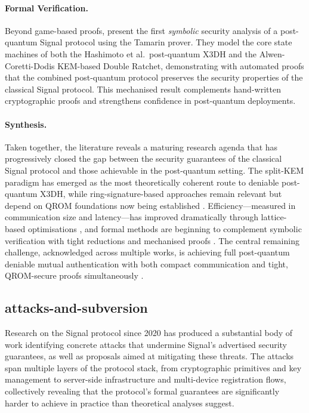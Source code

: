 \paragraph{Formal Verification.}
Beyond game-based proofs, \textcite{beguinet2024} present the first \emph{symbolic} security analysis of a post-quantum Signal protocol using the Tamarin prover. They model the core state machines of both the Hashimoto et al.\ post-quantum X3DH \parencite{hashimoto2021} and the Alwen-Coretti-Dodis KEM-based Double Ratchet, demonstrating with automated proofs that the combined post-quantum protocol preserves the security properties of the classical Signal protocol. This mechanised result complements hand-written cryptographic proofs and strengthens confidence in post-quantum deployments.

\paragraph{Synthesis.}
Taken together, the literature reveals a maturing research agenda that has progressively closed the gap between the security guarantees of the classical Signal protocol and those achievable in the post-quantum setting. The split-KEM paradigm \parencite{brendel2021,collins2024b,niot2025} has emerged as the most theoretically coherent route to deniable post-quantum X3DH, while ring-signature-based approaches \parencite{hashimoto2021,hashimoto2022,brendel2022,guo2025} remain relevant but depend on QROM foundations now being established \parencite{beckmann2026}. Efficiency—measured in communication size and latency—has improved dramatically through lattice-based optimisations \parencite{niot2025}, and formal methods are beginning to complement symbolic verification with tight reductions \parencite{collins2024} and mechanised proofs \parencite{beguinet2024}. The central remaining challenge, acknowledged across multiple works, is achieving full post-quantum deniable mutual authentication with both compact communication and tight, QROM-secure proofs simultaneously \parencite{niot2025,angom2025,collins2024b}.

\subsection{attacks-and-subversion}

Research on the Signal protocol since 2020 has produced a substantial body of work identifying concrete attacks that undermine Signal's advertised security guarantees, as well as proposals aimed at mitigating these threats. The attacks span multiple layers of the protocol stack, from cryptographic primitives and key management to server-side infrastructure and multi-device registration flows, collectively revealing that the protocol's formal guarantees are significantly harder to achieve in practice than theoretical analyses suggest.

